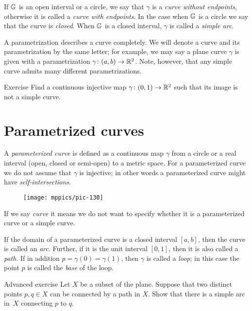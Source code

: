 If $\mathbb{G}$ is an open interval or a circle, we say that $\gamma$ is a \emph{curve without endpoints}, otherwise it is 
called a {}\emph{curve with endpoints}.
In the case when $\mathbb{G}$ is a circle we say that the curve is \emph{closed}. 
When $\mathbb{G}$ is a closed interval, $\gamma$ is called a \emph{simple arc}.


A parametrization describes a curve completely.
We will denote a curve and its parametrization by the same letter;
for example, we may say a plane curve $\gamma$ is given with a parametrization $\gamma\:(a,b)\z\to \RR^2$.
Note, however, that any simple curve admits many different parametrizations. 

\begin{thm}{Exercise}\label{ex:9}
Find a continuous injective map $\gamma\colon(0,1)\to\mathbb{R}^2$ such that its image is not a simple curve.
\end{thm}


\section{Parametrized curves}

A \emph{parameterized curve} is defined as a continuous map $\gamma$ from a circle or a real interval (open, closed or semi-open) to a metric space. 
For a parameterized curve we do not assume that $\gamma$ is injective; in other words a parameterized curve might have \emph{self-intersections}.

\begin{wrapfigure}{o}{17 mm}
\vskip-3mm
\centering
\texttt{[image: mppics/pic-130]}
\end{wrapfigure}

If we say \emph{curve} it means we do not want to specify whether it is a parameterized curve or a simple curve.

If the domain of a parameterized curve is a closed interval $[a,b]$, then the curve is called an \emph{arc}.
Further, if it is the unit interval $[0,1]$, then it is also called a \emph{path}.
If in addition $p=\gamma(0)=\gamma(1)$, then $\gamma$ is called a \emph{loop};
in this case the point $p$ is called the \emph{base} of the loop.

\begin{thm}{Advanced exercise}\label{aex:simple-curve}
Let $X$ be a subset of the plane.
Suppose that two distinct points $p,q\in X$ can be connected by a path in $X$.
Show that there is a simple arc in~$X$ connecting $p$ to $q$.
\end{thm}

